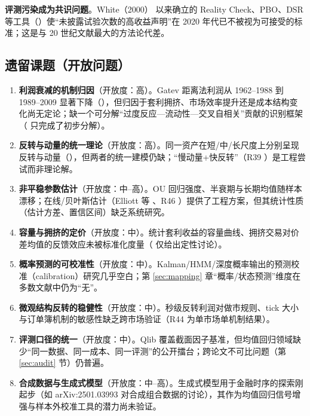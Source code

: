 \textbf{评测污染成为共识问题}。White（2000）\cite{white2000} 以来确立的 Reality Check、PBO、DSR 等工具（\cite{sullivan1999,bailey2014pbo,bailey2014dsr}）使“未披露试验次数的高收益声明”在 2020 年代已不被视为可接受的标准；这是与 20 世纪文献最大的方法论代差。

\subsection{遗留课题（开放问题）}

\begin{enumerate}
  \item \textbf{利润衰减的机制归因}（开放度：高）。Gatev 距离法利润从 1962--1988 到 1989--2009 显著下降（\cite{gatev2006,dofaff2012}），但归因于套利拥挤、市场效率提升还是成本结构变化尚无定论；缺一个可分解“过度反应—流动性—交叉自相关”贡献的识别框架（\cite{lomackinlay1990} 只完成了初步分解）。
  \item \textbf{反转与动量的统一理论}（开放度：高）。同一资产在短/中/长尺度上分别呈现反转与动量（\cite{poterbasummers1988,mom2012}），但两者的统一建模仍缺；“慢动量+快反转”（R39 \cite{arxiv_slowfast}）是工程尝试而非理论解。
  \item \textbf{非平稳参数估计}（开放度：中--高）。OU 回归强度、半衰期与长期均值随样本漂移；在线/贝叶斯估计（Elliott 等 \cite{elliott2005}、R46 \cite{arxiv_neural_kalman}）提供了工程方案，但其统计性质（估计方差、置信区间）缺乏系统研究。
  \item \textbf{容量与拥挤的定价}（开放度：中）。统计套利收益的容量曲线、拥挤交易对价差均值的反馈效应未被标准化度量（\cite{avellaneda2010} 仅给出定性讨论）。
  \item \textbf{概率预测的可校准性}（开放度：中）。Kalman/HMM/深度概率输出的预测校准（calibration）研究几乎空白；第 \ref{sec:mapping} 章“概率/状态预测”维度在多数文献中仍为“无”。
  \item \textbf{微观结构反转的稳健性}（开放度：中）。秒级反转利润对做市规则、tick 大小与订单簿机制的敏感性缺乏跨市场验证（R44 \cite{arxiv_microstructure} 为单市场单机制结果）。
  \item \textbf{评测口径的统一}（开放度：中）。Qlib \cite{qlib} 覆盖截面因子基准，但均值回归领域缺少“同一数据、同一成本、同一评测”的公开擂台；跨论文不可比问题（第 \ref{sec:audit} 节）仍普遍。
  \item \textbf{合成数据与生成式模型}（开放度：中--高）。生成式模型用于金融时序的探索刚起步（如 arXiv:2501.03993 对合成组合数据的讨论），其作为均值回归信号增强与样本外校准工具的潜力尚未验证。
\end{enumerate}

